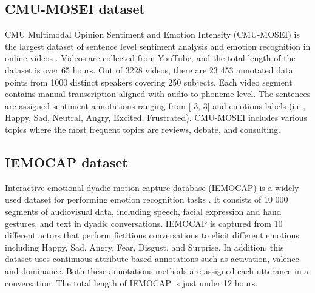 \subsection{CMU-MOSEI dataset}
CMU Multimodal Opinion Sentiment and Emotion Intensity (CMU-MOSEI) is the largest dataset of sentence level sentiment analysis and emotion recognition in online videos \cite{MSA_review2_GANDHI2023424} \cite{cmu-mosei_zadeh2018multimodal}. Videos are collected from YouTube, and the total length of the dataset is over 65 hours. Out of 3228 videos, there are 23 453 annotated data points from 1000 distinct speakers covering 250 subjects. Each video segment contains manual transcription aligned with audio to phoneme level. The sentences are assigned sentiment annotations ranging from [-3, 3] and emotions labels (i.e., Happy, Sad, Neutral, Angry, Excited, Frustrated). CMU-MOSEI includes various topics where the most frequent topics are reviews, debate, and consulting. 

\subsection{IEMOCAP dataset}
Interactive emotional dyadic motion capture database (IEMOCAP) is a widely used dataset for performing emotion recognition tasks \cite{iemocap_dataset}. It consists of 10 000 segments of audiovisual data, including speech, facial expression and hand gestures, and text in dyadic conversations. IEMOCAP is captured from 10 different actors that perform fictitious conversations to elicit different emotions including Happy, Sad, Angry, Fear, Disgust, and Surprise. In addition, this dataset uses continuous attribute based annotations such as activation, valence and dominance. Both these annotations methods are assigned each utterance in a conversation. The total length of IEMOCAP is just under 12 hours. \\

